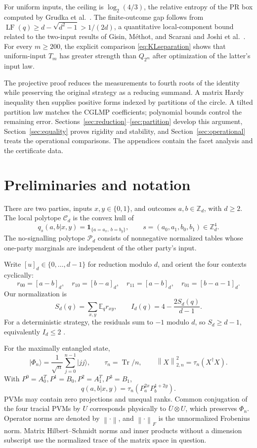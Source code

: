 \documentclass[11pt]{amsart}
\theoremstyle{remark}
\theoremstyle{plain}
\numberwithin{equation}{section}
\DeclareMathOperator{\Tr}{Tr}
\DeclareMathOperator{\LF}{LF}
\newcommand{\Z}{\mathbb Z}
\newcommand{\ind}{\mathbf 1}
\newcommand{\Loc}{\mathcal C}
\newcommand{\NS}{\mathcal P}
\newcommand{\ket}[1]{\lvert#1\rangle}
\newcommand{\norm}[1]{\left\|#1\right\|}
\begin{document}
For uniform inputs, the ceiling is \(\log_2(4/3)\), the relative
entropy of the PR box computed by Grudka et al.\ \cite{Grudka}.
The finite-outcome gap follows from
\(\LF(q)\ge d-\sqrt{d^2-1}>1/(2d)\), a quantitative local-component
bound related to the two-input results of
Gisin, M\'ethot, and Scarani \cite{GMS} and Joshi et al.\ \cite{Joshi}.
For every \(m\ge200\), the explicit comparison
\eqref{eq:KLseparation} shows that uniform-input \(T_m\) has greater
strength than \(Q_{2^m}\) after optimization of the latter's input law.

The projective proof reduces the measurements to fourth roots of the
identity while preserving the original strategy as a reducing
summand. A matrix Hardy inequality then supplies positive forms
indexed by partitions of the circle. A tilted partition law matches
the CGLMP coefficients; polynomial bounds control the remaining
error. Sections~\ref{sec:reduction}--\ref{sec:partition} develop this
argument, Section~\ref{sec:equality} proves rigidity and stability,
and Section~\ref{sec:operational} treats the operational comparisons.
The appendices contain the facet analysis and the certificate data.

\section{Preliminaries and notation}\label{sec:preliminaries}

There are two parties, inputs \(x,y\in\{0,1\}\), and outcomes
\(a,b\in\Z_d\), with \(d\ge2\).
The local polytope \(\Loc_d\) is the convex hull of
\[
 q_s(a,b|x,y)=\ind_{\{a=a_x,\ b=b_y\}},
 \qquad s=(a_0,a_1,b_0,b_1)\in\Z_d^4.
\]
The no-signalling polytope \(\NS_d\) consists of nonnegative normalized
tables whose one-party marginals are independent of the other party's
input.

Write \([u]_d\in\{0,\ldots,d-1\}\) for reduction modulo \(d\), and
orient the four contexts cyclically:
\[
 r_{00}=[a-b]_d,\quad r_{10}=[b-a]_d,\quad
 r_{11}=[a-b]_d,\quad r_{01}=[b-a-1]_d.
\]
Our normalization is
\begin{equation}\label{eq:Id}
 S_d(q)=\sum_{x,y}\mathbb E_qr_{xy},
 \qquad I_d(q)=4-\frac{2S_d(q)}{d-1}.
\end{equation}
For a deterministic strategy, the residuals sum to \(-1\) modulo
\(d\), so \(S_d\ge d-1\), equivalently \(I_d\le2\)
\cite{CGLMP,AGG}.

For the maximally entangled state,
\[
 \ket{\Phi_n}=\frac1{\sqrt n}\sum_{j=0}^{n-1}\ket{jj},
 \qquad \tau_n=\Tr/n,\qquad
 \norm{X}_{2,n}^2=\tau_n(X^\dagger X).
\]
With \(P^0=A_0^T,P^1=B_0,P^2=A_1^T,P^3=B_1\),
\[
 q(a,b|x,y)=\tau_n(P^{2x}_aP^{1+2y}_b).
\]
PVMs may contain zero projections and unequal ranks.
Common conjugation of the four tracial PVMs by \(U\) corresponds
physically to \(\overline U\otimes U\), which preserves \(\Phi_n\).
Operator norms are denoted by \(\norm{\cdot}\), and
\(\norm{\cdot}_F\) is the unnormalized Frobenius norm.
Matrix Hilbert--Schmidt norms and inner products without a dimension
subscript use the normalized trace of the matrix space in question.
\end{document}
